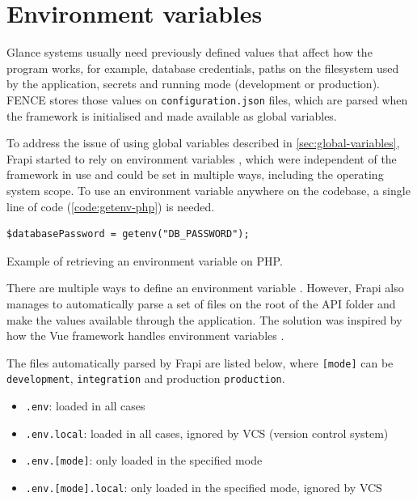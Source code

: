 \section{Environment variables}

Glance systems usually need previously defined values that affect how the program works, for example, database credentials, paths on the filesystem used by the application, secrets and running mode (development or production). FENCE stores those values on \texttt{configuration.json} files, which are parsed when the framework is initialised and made available as global variables.

To address the issue of using global variables described in \autoref{sec:global-variables}, Frapi started to rely on environment variables \cite{frapi-environment-variables}, which were independent of the framework in use and could be set in multiple ways, including the operating system scope. To use an environment variable anywhere on the codebase, a single line of code (\autoref{code:getenv-php}) is needed.

\begin{listing}[htbp]
\begin{verbatim}
$databasePassword = getenv("DB_PASSWORD");
\end{verbatim}
\caption{Example of retrieving an environment variable on PHP.}
\label{code:getenv-php}
\end{listing}

There are multiple ways to define an environment variable \cite{defining-environment-variables}. However, Frapi also manages to automatically parse a set of files on the root of the API folder and make the values available through the application. The solution was inspired by how the Vue framework \cite{vue-about} handles environment variables \cite{vue-environment-variables}.

The files automatically parsed by Frapi are listed below, where \texttt{[mode]} can be \texttt{development}, \texttt{integration} and production \texttt{production}.

\begin{itemize}
    \item \texttt{.env}: loaded in all cases
    \item \texttt{.env.local}: loaded in all cases, ignored by VCS (version control system)
    \item \texttt{.env.[mode]}: only loaded in the specified mode
    \item \texttt{.env.[mode].local}: only loaded in the specified mode, ignored by VCS
\end{itemize}


